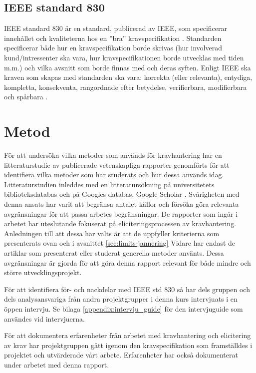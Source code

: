 \subsection{IEEE standard 830}
IEEE standard 830 är en standard, publicerad av IEEE, som specificerar innehållet och kvaliteterna hos en ”bra” kravspecifikation \cite{ieee1998ieee}. Standarden specificerar både hur en kravspecifikation borde skrivas (hur involverad kund/intressenter ska vara, hur kravspecifikationen borde utvecklas med tiden m.m.) och vilka avsnitt som borde finnas med och deras syften. Enligt IEEE ska kraven som skapas med standarden ska vara: korrekta (eller relevanta), entydiga, kompletta, konsekventa, rangordnade efter betydelse, verifierbara, modifierbara och spårbara \cite{ieee1998ieee}.

\section{Metod}
\label{sec:method-jannering}

För att undersöka vilka metoder som används för kravhantering har en litteraturstudie av publicerade vetenskapliga rapporter genomförts för att identifiera vilka metoder som har studerats och hur dessa används idag. Litteraturstudien inleddes med en litteratursökning  på universitetets biblioteksdatabas och på Googles databas, Google Scholar \cite{google_scholar}. Svårigheten med denna ansats har varit att begränsa antalet källor och försöka göra relevanta avgränsningar för att passa arbetes begränsningar. De rapporter som ingår i arbetet har uteslutande fokuserat på eliciteringsprocessen av kravhantering. Anledningen till att dessa har valts är att de uppfyller kriterierna som presenterats ovan och i avsnittet \ref{sec:limits-jannering} Vidare har endast de artiklar som presenterat eller studerat generella metoder använts. Dessa avgränsningar är gjorda för att göra denna rapport relevant för både mindre och större utvecklingsprojekt.
  
För att identifiera för- och nackdelar med IEEE std 830 \cite{ieee1998ieee} så har dels gruppen och dels analysansvariga från andra projektgrupper i denna kurs intervjuats i en öppen intervju. Se bilaga \ref{appendix:intervju_guide} för den intervjuguide som användes vid intervjuerna.

För att dokumentera erfarenheter från arbetet med kravhantering och elicitering av krav har projektgruppen gått igenom den kravspecifikation som framställdes i projektet och utvärderade vårt arbete. Erfarenheter har också dokumenterat under arbetet med denna rapport.




